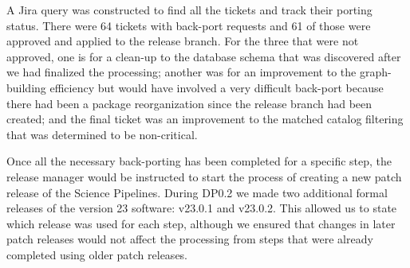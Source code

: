 A Jira query was constructed to find all the tickets and track their porting status.
There were 64 tickets with back-port requests and 61 of those were approved and applied to the release branch.
For the three that were not approved, one is for a clean-up to the database schema that was discovered after we had finalized the processing; another was for an improvement to the graph-building efficiency but would have involved a very difficult back-port because there had been a package reorganization since the release branch had been created; and the final ticket was an improvement to the matched catalog filtering that was determined to be non-critical.

Once all the necessary back-porting has been completed for a specific step, the release manager would be instructed to start the process of creating a new patch release of the Science Pipelines.
During DP0.2 we made two additional formal releases of the version 23 software: v23.0.1 and v23.0.2.
This allowed us to state which release was used for each step, although we ensured that changes in later patch releases would not affect the processing from steps that were already completed using older patch releases.
